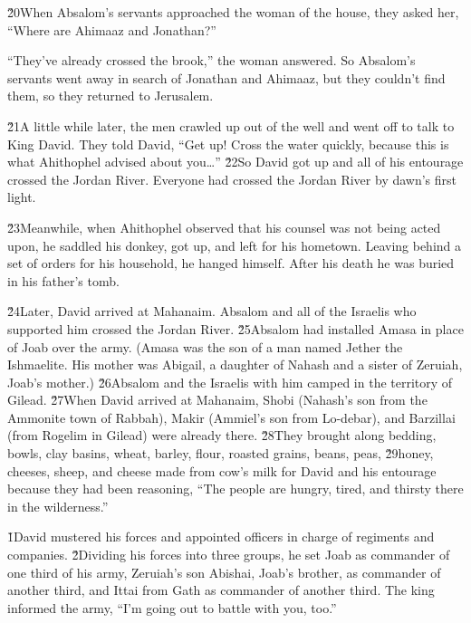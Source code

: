 \v{20}When Absalom's servants approached the woman of the house, they asked her, ``Where are Ahimaaz and Jonathan?''

``They've already crossed the brook,'' the woman answered. So Absalom's servants went away in search of Jonathan and Ahimaaz, but they couldn't find them, so they returned to Jerusalem.

\v{21}A little while later, the men crawled up out of the well and went off to talk to King David. They told David, ``Get up! Cross the water quickly, because this is what Ahithophel advised about you{\ldots}'' \v{22}So David got up and all of his entourage crossed the Jordan River. Everyone had crossed the Jordan River by dawn's first light.

\v{23}Meanwhile, when Ahithophel observed that his counsel was not being acted upon, he saddled his donkey, got up, and left for his hometown. Leaving behind a set of orders for his household, he hanged himself. After his death he was buried in his father's tomb.

\v{24}Later, David arrived at Mahanaim. Absalom and all of the Israelis who supported him crossed the Jordan River. \v{25}Absalom had installed Amasa in place of Joab over the army. (Amasa was the son of a man named Jether the Ishmaelite. His mother was Abigail, a daughter of Nahash and a sister of Zeruiah, Joab's mother.) \v{26}Absalom and the Israelis with him camped in the territory of Gilead. \v{27}When David arrived at Mahanaim, Shobi (Nahash's son from the Ammonite town of Rabbah), Makir (Ammiel's son from Lo-debar), and Barzillai (from Rogelim in Gilead) were already there. \v{28}They brought along bedding, bowls, clay basins, wheat, barley, flour, roasted grains, beans, peas, \v{29}honey, cheeses, sheep, and cheese made from cow's milk for David and his entourage because they had been reasoning, ``The people are hungry, tired, and thirsty there in the wilderness.''

\v{1}David mustered his forces and appointed officers in charge of regiments and companies. \v{2}Dividing his forces into three groups, he set Joab as commander of one third of his army, Zeruiah's son Abishai, Joab's brother, as commander of another third, and Ittai from Gath as commander of another third. The king informed the army, ``I'm going out to battle with you, too.''

